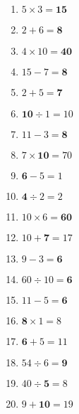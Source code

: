 \documentclass[a4paper,11pt]{article}
\begin{document}
  \begin{multicols}{4}\noindent
    \begin{enumerate}
    \item $5 \times 3 = \mathbf{15}$
    \item $2 + 6 = \mathbf{8}$
    \item $4 \times 10 = \mathbf{40}$
    \item $15 - 7 = \mathbf{8}$
    \item $2 + 5 = \mathbf{7}$
    \item $\mathbf{10} \div 1 = 10$
    \item $11 - 3 = \mathbf{8}$
    \item $7 \times \mathbf{10} = 70$
    \item $\mathbf{6} - 5 = 1$
    \item $\mathbf{4} \div 2 = 2$
    \item $10 \times 6 = \mathbf{60}$
    \item $10 + \mathbf{7} = 17$
    \item $9 - 3 = \mathbf{6}$
    \item $60 \div 10 = \mathbf{6}$
    \item $11 - 5 = \mathbf{6}$
    \item $\mathbf{8} \times 1 = 8$
    \item $\mathbf{6} + 5 = 11$
    \item $54 \div 6 = \mathbf{9}$
    \item $40 \div \mathbf{5} = 8$
    \item $9 + \mathbf{10} = 19$
    \end{enumerate}
  \end{multicols}
  \label{LastCorPage}
\end{document}
